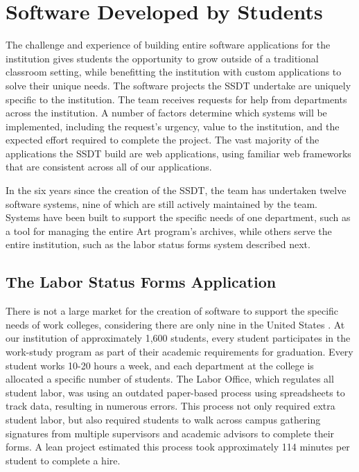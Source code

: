 \section{Software Developed by Students}

The challenge and experience of building entire software applications for the institution gives students the opportunity to grow outside of a traditional classroom setting, while benefitting the institution with custom applications to solve their unique needs. The software projects the SSDT undertake are uniquely specific to the institution. The team receives requests for help from departments across the institution. A number of factors determine which systems will be implemented, including the request’s urgency, value to the institution, and the expected effort required to complete the project. The vast majority of the applications the SSDT build are web applications, using familiar web frameworks that are consistent across all of our applications.

In the six years since the creation of the SSDT, the team has undertaken twelve software systems, nine of which are still actively maintained by the team. Systems have been built to support the specific needs of one department, such as a tool for managing the entire Art program's archives, while others serve the entire institution, such as the labor status forms system described next.

\subsection{The Labor Status Forms Application}
There is not a large market for the creation of software to support the specific needs of work colleges, considering there are only nine in the United States \cite{WCCMembers, Ecclesia}. At our institution of approximately 1,600 students, every student participates in the work-study program as part of their academic requirements for graduation. Every student works 10-20 hours a week, and each department at the college is allocated a specific number of students. The Labor Office, which regulates all student labor, was using an outdated paper-based process using spreadsheets to track data, resulting in numerous errors. This process not only required extra student labor, but also required students to walk across campus gathering signatures from multiple supervisors and academic advisors to complete their forms. A lean project estimated this process took approximately 114 minutes per student to complete a hire.

